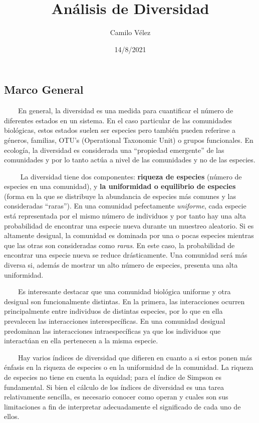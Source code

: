 \documentclass[
]{article}
\title{Análisis de Diversidad}
\author{Camilo Vélez}
\date{14/8/2021}
\begin{document}
\maketitle

{
\setcounter{tocdepth}{2}
\tableofcontents
}
\hypertarget{marco-general}{%
\subsection{Marco General}\label{marco-general}}

~~~~En general, la diversidad es una medida para cuantificar el número
de diferentes estados en un sistema. En el caso particular de las
comunidades biológicas, estos estados suelen ser especies pero también
pueden referirse a géneros, familias, OTU's (Operational Taxonomic Unit)
o grupos funcionales. En ecología, la diversidad es considerada una
``propiedad emergente'' de las comunidades y por lo tanto actúa a nivel
de las comunidades y no de las especies.

~~~~ La diversidad tiene dos componentes: \textbf{riqueza de especies}
(número de especies en una comunidad), y \textbf{la uniformidad o
equilibrio de especies} (forma en la que se distribuye la abundancia de
especies más comunes y las consideradas ``raras''). En una comunidad
pefectamente \emph{uniforme}, cada especie está representada por el
mismo número de individuos y por tanto hay una alta probabilidad de
encontrar una especie nueva durante un muestreo aleatorio. Si es
altamente desigual, la comunidad es dominada por una o pocas especies
mientras que las otras son consideradas como \emph{raras}. En este caso,
la probabilidad de encontrar una especie nueva se reduce drásticamente.
Una comunidad será más diversa si, además de mostrar un alto número de
especies, presenta una alta uniformidad.

~~~~Es interesante destacar que una comunidad biológica uniforme y otra
desigual son funcionalmente distintas. En la primera, las interacciones
ocurren principalmente entre individuos de distintas especies, por lo
que en ella prevalecen las interacciones interespecíficas. En una
comunidad desigual predominan las interacciones intraespecíficas ya que
los individuos que interactúan en ella pertenecen a la misma especie.

~~~~Hay varios índices de diversidad que difieren en cuanto a si estos
ponen más énfasis en la riqueza de especies o en la uniformidad de la
comunidad. La riqueza de especies no tiene en cuenta la equidad; para el
índice de Simpson es fundamental. Si bien el cálculo de los índices de
diversidad es una tarea relativamente sencilla, es necesario conocer
como operan y cuales son sus limitaciones a fin de interpretar
adecuadamente el significado de cada uno de ellos.
\end{document}
